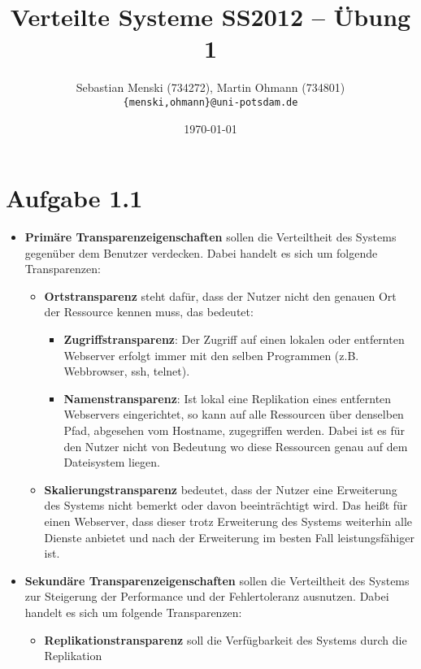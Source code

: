 \documentclass[german,12pt,a4paper]{article}
\begin{document}
\title{\textbf{Verteilte Systeme SS2012 -- Übung 1}}
\author{Sebastian Menski (734272), Martin Ohmann (734801) \\ \texttt{\{menski,ohmann\}@uni-potsdam.de}}
\date{\today}

\maketitle

\section*{Aufgabe 1.1}

\begin{itemize}
	\item \textbf{Primäre Transparenzeigenschaften} sollen die Verteiltheit des Systems gegenüber dem Benutzer
	verdecken. Dabei handelt es sich um folgende Transparenzen:
	\begin{itemize}
		\item \textbf{Ortstransparenz} steht dafür, dass der Nutzer nicht den genauen Ort der Ressource kennen
		muss, das bedeutet:
		\begin{itemize}
			\item \textbf{Zugriffstransparenz}: Der Zugriff auf einen lokalen oder entfernten Webserver erfolgt
			immer mit den selben Programmen (z.B. Webbrowser, ssh, telnet).
			\item \textbf{Namenstransparenz}: Ist lokal eine Replikation eines entfernten Webservers eingerichtet,
			so kann auf alle Ressourcen über denselben Pfad, abgesehen vom Hostname, zugegriffen werden. Dabei
			ist es für den Nutzer nicht von Bedeutung wo diese Ressourcen genau auf dem Dateisystem liegen.
		\end{itemize}
		\item \textbf{Skalierungstransparenz} bedeutet, dass der Nutzer eine Erweiterung des Systems nicht
		bemerkt oder davon beeinträchtigt wird. Das heißt für einen Webserver, dass dieser trotz
		Erweiterung des Systems weiterhin alle Dienste anbietet und nach der Erweiterung im besten Fall
		leistungsfähiger ist.
	\end{itemize}
	\item \textbf{Sekundäre Transparenzeigenschaften} sollen die Verteiltheit des Systems zur Steigerung der
	Performance und der Fehlertoleranz ausnutzen. Dabei handelt es sich um folgende Transparenzen:
	\begin{itemize}
		\item \textbf{Replikationstransparenz} soll die Verfügbarkeit des Systems durch die Replikation

\end{itemize}
\end{itemize}
\end{document}
